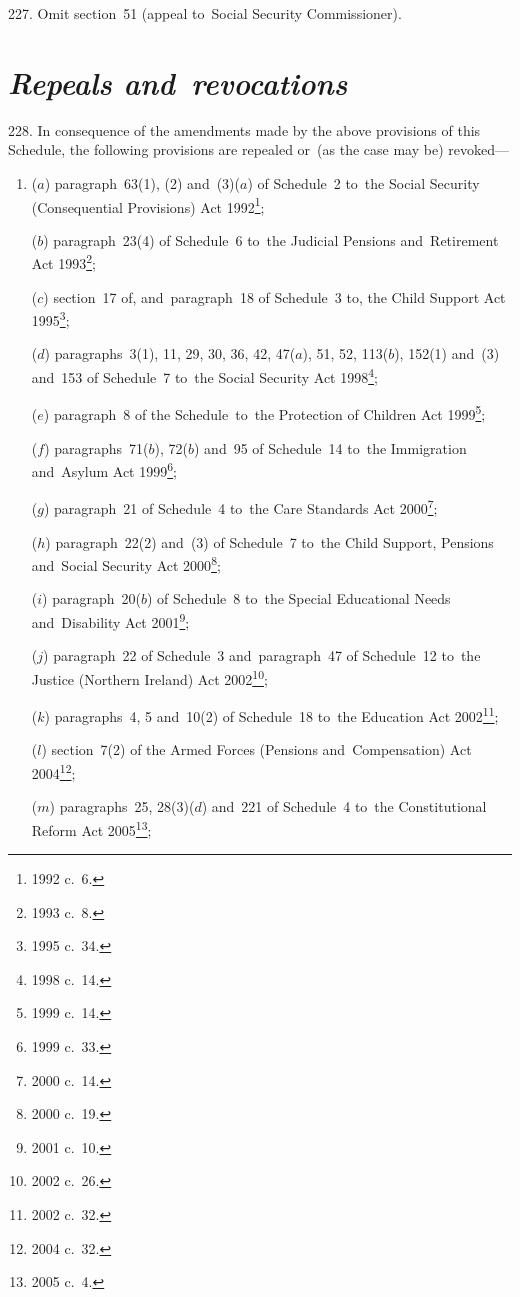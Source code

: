 \documentclass[12pt,a4paper]{article}
\begin{document}
\medskip

227.  Omit section~51 (appeal to~Social Security Commissioner).

\section*{\itshape Repeals and~revocations}

228.  In consequence of the amendments made by the above provisions of this Schedule, the following provisions are repealed or~(as the case may be) revoked—
\begin{enumerate}\item[]
($a$) paragraph~63(1), (2) and~(3)($a$)  of Schedule~2 to~the Social Security (Consequential Provisions) Act 1992\footnote{1992 c.~6.};

($b$) paragraph~23(4) of Schedule~6 to~the Judicial Pensions and~Retirement Act 1993\footnote{1993 c.~8.};

($c$) section~17 of, and~paragraph~18 of Schedule~3 to, the Child Support Act 1995\footnote{1995 c.~34.};

($d$) paragraphs~3(1), 11, 29, 30, 36, 42, 47($a$), 51, 52, 113($b$), 152(1) and~(3) and~153 of Schedule~7 to~the Social Security Act 1998\footnote{1998 c.~14.};

($e$) paragraph~8 of the Schedule~to~the Protection of Children Act 1999\footnote{1999 c.~14.};

($f$) paragraphs~71($b$), 72($b$)  and~95 of Schedule~14 to~the Immigration and~Asylum Act 1999\footnote{1999 c.~33.};

($g$) paragraph~21 of Schedule~4 to~the Care Standards Act 2000\footnote{2000 c.~14.};

($h$) paragraph~22(2) and~(3) of Schedule~7 to~the Child Support, Pensions and~Social Security Act 2000\footnote{2000 c.~19.};

($i$) paragraph~20($b$)  of Schedule~8 to~the Special Educational Needs and~Disability Act 2001\footnote{2001 c.~10.};

($j$) paragraph~22 of Schedule~3 and~paragraph~47 of Schedule~12 to~the Justice (Northern Ireland) Act 2002\footnote{2002 c.~26.};

($k$) paragraphs~4, 5 and~10(2) of Schedule~18 to~the Education Act 2002\footnote{2002 c.~32.};

($l$) section~7(2) of the Armed Forces (Pensions and~Compensation) Act 2004\footnote{2004 c.~32.};

($m$) paragraphs~25, 28(3)($d$)  and~221 of Schedule~4 to~the Constitutional Reform Act 2005\footnote{2005 c.~4.};


\end{enumerate}
\end{document}
